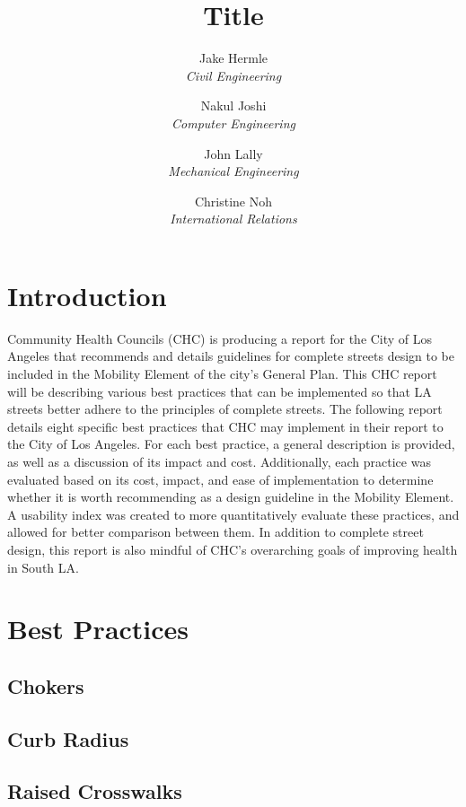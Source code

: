 \documentclass[titlepage]{article}
\title{Title}
\author{
	Jake Hermle\\ \emph{Civil Engineering} \and
	Nakul Joshi\\ \emph{Computer Engineering} \and
	John Lally\\ \emph{Mechanical Engineering}\and
	Christine Noh\\ \emph{International Relations}
}
\begin{document}
\maketitle

\begin{abstract}

\end{abstract}

\tableofcontents
\newpage
\listoffigures
\newpage
\listoftables
\newpage



\section{Introduction}

Community Health Councils (CHC) is producing a report for the City of Los Angeles that recommends and details guidelines for complete streets design to be included in the Mobility Element of the city’s General Plan. This CHC report will be describing various best practices that can be implemented so that LA streets better adhere to the principles of complete streets. The following report details eight specific best practices that CHC may implement in their report to the City of Los Angeles. For each best practice, a general description is provided, as well as a discussion of its impact and cost. Additionally, each practice was evaluated based on its cost, impact, and ease of implementation to determine whether it is worth recommending as a design guideline in the Mobility Element. A usability index was created to more quantitatively evaluate these practices, and allowed for better comparison between them. In addition to complete street design, this report is also mindful of CHC’s overarching goals of improving health in South LA.

\newpage

\section{Best Practices}
	\subsection{Chokers}
		
	\subsection{Curb Radius}
		
	\subsection{Raised Crosswalks}
		
\end{document}
